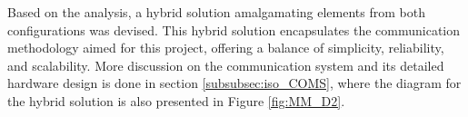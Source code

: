 \noindent
Based on the analysis, a hybrid solution amalgamating elements from both configurations was devised. This hybrid solution encapsulates the communication methodology aimed for this project, offering a balance of simplicity, reliability, and scalability. More discussion on the communication system and its detailed hardware design is done in section \ref{subsubsec:iso_COMS}, where the diagram for the hybrid solution is also presented in Figure \ref{fig:MM_D2}.


\vfill
